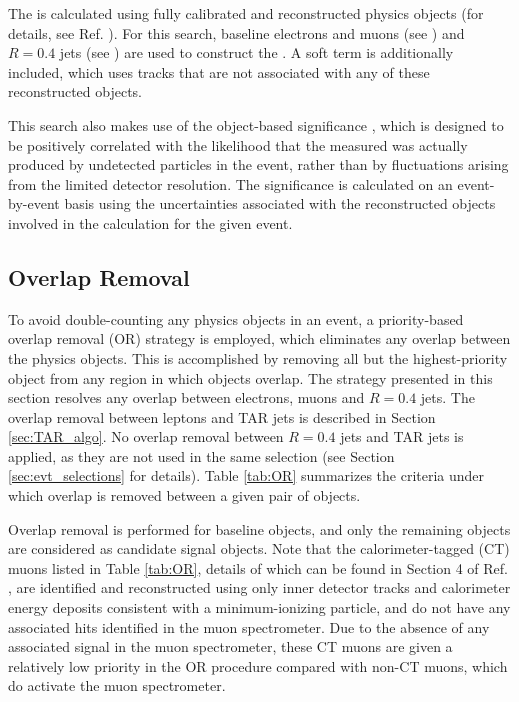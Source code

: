 The \met is calculated using fully calibrated and reconstructed physics objects (for details, see Ref. \cite{PERF-2016-07}). For this search, baseline electrons and muons (see \Sect{\ref{sec:charged_leptons}}) and \(R=0.4\) jets (see \Sect{\ref{sec:atk4_jets}}) are used to construct the \met. A soft term is additionally included, which uses tracks that are not associated with any of these reconstructed objects. 

This search also makes use of the object-based \met significance \metsig \cite{ATLAS-CONF-2018-038}, which is designed to be positively correlated with the likelihood that the measured \met was actually produced by undetected particles in the event, rather than by fluctuations arising from the limited detector resolution. The \met significance is calculated on an event-by-event basis using the uncertainties associated with the reconstructed objects involved in the \met calculation for the given event.

\subsection{Overlap Removal}

To avoid double-counting any physics objects in an event, a priority-based overlap removal (OR) strategy is employed, which eliminates any overlap between the physics objects. This is accomplished by removing all but the highest-priority object from any region in which objects overlap. The strategy presented in this section resolves any overlap between electrons, muons and \(R=0.4\) \smallR jets. The overlap removal between leptons and TAR jets is described in Section \ref{sec:TAR_algo}. No overlap removal between \(R=0.4\) jets and TAR jets is applied, as they are not used in the same selection (see Section \ref{sec:evt_selections} for details). Table \ref{tab:OR} summarizes the criteria under which overlap is removed between a given pair of objects. 

Overlap removal is performed for baseline objects, and only the remaining objects are considered as candidate signal objects. Note that the calorimeter-tagged (CT) muons listed in Table \ref{tab:OR}, details of which can be found in Section 4 of Ref. \cite{muon_reco}, are identified and reconstructed using only inner detector tracks and calorimeter energy deposits consistent with a minimum-ionizing particle, and do not have any associated hits identified in the muon spectrometer. Due to the absence of any associated signal in the muon spectrometer, these CT muons are given a relatively low priority in the OR procedure compared with non-CT muons, which do activate the muon spectrometer.

